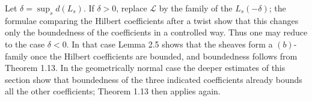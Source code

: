 \documentclass[12pt]{article}
\begin{document}
Let $\delta=\sup_s d(L_s)$. If $\delta>0$, replace $\mathscr L$ by the family of the $L_s(-\delta)$; the formulae comparing the Hilbert coefficients after a twist show that this changes only the boundedness of the coefficients in a controlled way. Thus one may reduce to the case $\delta<0$. In that case Lemma 2.5 shows that the sheaves form a $(b)$-family once the Hilbert coefficients are bounded, and boundedness follows from Theorem 1.13. In the geometrically normal case the deeper estimates of this section show that boundedness of the three indicated coefficients already bounds all the other coefficients; Theorem 1.13 then applies again.
\end{document}
